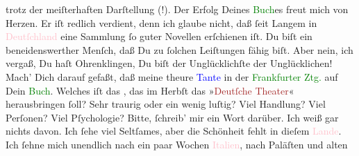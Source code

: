                trotz der meiſterhaften Darſtellung (\label{K_L02848-55v}\label{K_L02848-55h}!). Der Erfolg
               Deines \textcolor{green}{Buch}{}es freut mich von
               Herzen. Er iſt redlich verdient, {\pb}denn ich glaube
               nicht, daß ſeit Langem in \textcolor{pink}{Deutſchland}{}\ledrightnote{\textcolor{pink}{Deutschland}} eine
               Sammlung ſo guter Novellen erſchienen iſt. Du biſt ein beneidenswerther Menſch, daß
               Du zu ſolchen Leiſtungen fähig biſt. Aber nein, ich vergaß, Du haſt Ohrenklingen, Du
               biſt der Unglücklichſte der Unglücklichen!\pend
           \pstart
           Mach’ Dich darauf gefaßt, daß meine theure \textcolor{blue}{Tante}{} in der \textcolor{green}{Frankfurter
                  Ztg.}{}\ledrightnote{\textcolor{green}{Frankfurter Zeitung}} auf Dein \textcolor{green}{Buch}{}\label{K_L02848-7v}\label{K_L02848-7h}.\pend
           \pstart
           Welches iſt das \label{K_L02848-11v}\label{K_L02848-11h}, {\pb}das im Herbſt das »\textcolor{brown}{Deutſche Theater}{}\ledrightnote{\textcolor{brown}{Deutsches Theater Berlin}}« herausbringen ſoll? Sehr traurig oder ein wenig luſtig?
               Viel Handlung? Viel Perſonen? Viel Pſychologie? Bitte, ſchreib’ mir ein Wort darüber.
               Ich weiß gar nichts davon.\pend
           \pstart
           Ich ſehe viel Seltſames, aber die Schönheit fehlt in dieſem \textcolor{pink}{Lande}{}. Ich ſehne mich unendlich nach ein
               paar Wochen \textcolor{pink}{Italien}{}\ledrightnote{\textcolor{pink}{Italien}}, nach Paläſten und alten
